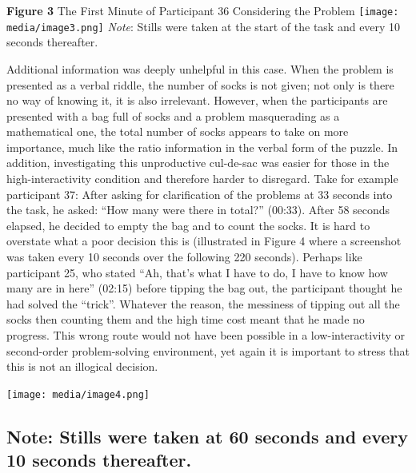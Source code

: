 {{\textbf{Figure 3} 
The First Minute of Participant 36 Considering the Problem \texttt{[image: media/image3.png]} 
\emph{Note}: Stills were taken at the start of the task and every 10 seconds thereafter.

Additional information was deeply unhelpful in this case. When the problem is presented as a verbal riddle, the number of socks is not given; not only is there no way of knowing it, it is also irrelevant.
However, when the participants are presented with a bag full of socks and a problem masquerading as a mathematical one, the total number of socks appears to take on more importance, much like the ratio information in the verbal form of the puzzle. In addition, investigating this unproductive cul-de-sac was easier for those in the high-interactivity condition and therefore harder to disregard. Take for example participant 37: After asking for clarification of the problems at 33 seconds into the task, he asked: ``How many were there in total?'' (00:33). After 58 seconds elapsed, he decided to empty the bag and to count the socks. It is hard to overstate what a poor decision this is (illustrated in Figure 4 where a screenshot was taken every 10 seconds over the following 220 seconds). Perhaps like participant 25, who stated ``Ah, that's what I have to do, I have to know how many are in here'' (02:15) before tipping the bag out, the participant thought he had solved the ``trick''. Whatever the reason, the messiness of tipping out all the socks then counting them and the high time cost meant that he made no progress. This wrong route would not have been possible in a low-interactivity or second-order problem-solving environment, yet again it is important to stress that this is not an illogical decision.

\texttt{[image: media/image4.png]} 

\subsection{Note: Stills were taken at 60 seconds and every 10 seconds thereafter.}


\subsection{}


}}
